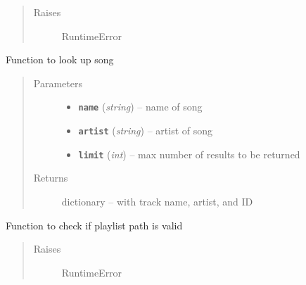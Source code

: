 \documentclass[letterpaper,10pt,english]{sphinxmanual}
\begin{document}
\begin{fulllineitems}
\begin{fulllineitems}
\begin{quote}
\begin{description}
\begin{itemize}
\end{itemize}

\item[{Raises}] \leavevmode
RuntimeError

\end{description}\end{quote}

\end{fulllineitems}


\begin{fulllineitems}
\label{code:gitsound.SpotifyUser.song_lookup}
Function to look up song
\begin{quote}\begin{description}
\item[{Parameters}] \leavevmode\begin{itemize}
\item {} 
\textbf{\texttt{name}} (\emph{string}) -- name of song

\item {} 
\textbf{\texttt{artist}} (\emph{string}) -- artist of song

\item {} 
\textbf{\texttt{limit}} (\emph{int}) -- max number of results to be returned

\end{itemize}

\item[{Returns}] \leavevmode
dictionary -- with track name, artist, and ID

\end{description}\end{quote}

\end{fulllineitems}


\end{fulllineitems}

\label{code:module-util}

\begin{fulllineitems}
\label{code:util.check_if_git_playlist}
Function to check if playlist path is valid
\begin{quote}\begin{description}
\item[{Raises}] \leavevmode
RuntimeError

\end{description}\end{quote}

\end{fulllineitems}
\end{document}
